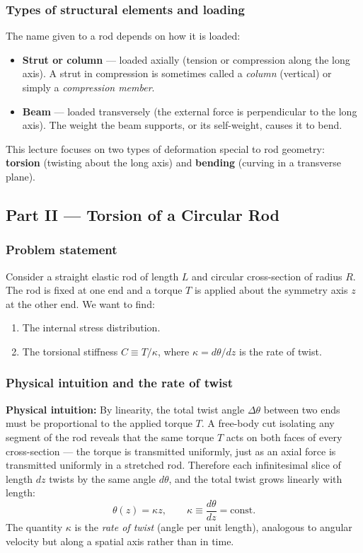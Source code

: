 \documentclass[../main.tex]{subfiles}
\begin{document}
\subsubsection*{Types of structural elements and loading}

The name given to a rod depends on how it is loaded:
\begin{itemize}
    \item \textbf{Strut or column} — loaded axially (tension or compression along the long axis). A strut in compression is sometimes called a \emph{column} (vertical) or simply a \emph{compression member}.
    \item \textbf{Beam} — loaded transversely (the external force is perpendicular to the long axis). The weight the beam supports, or its self-weight, causes it to bend.
\end{itemize}
This lecture focuses on two types of deformation special to rod geometry: \textbf{torsion} (twisting about the long axis) and \textbf{bending} (curving in a transverse plane).

\subsection*{Part II — Torsion of a Circular Rod}

\subsubsection*{Problem statement}

Consider a straight elastic rod of length $L$ and circular cross-section of radius $R$. The rod is fixed at one end and a torque $T$ is applied about the symmetry axis $z$ at the other end. We want to find:
\begin{enumerate}
    \item The internal stress distribution.
    \item The torsional stiffness $C \equiv T/\kappa$, where $\kappa = d\theta/dz$ is the rate of twist.
\end{enumerate}

\subsubsection*{Physical intuition and the rate of twist}

\noindent\textbf{Physical intuition:} By linearity, the total twist angle $\Delta\theta$ between two ends must be proportional to the applied torque $T$. A free-body cut isolating any segment of the rod reveals that the same torque $T$ acts on both faces of every cross-section — the torque is transmitted uniformly, just as an axial force is transmitted uniformly in a stretched rod. Therefore each infinitesimal slice of length $dz$ twists by the same angle $d\theta$, and the total twist grows linearly with length:
\[
    \theta(z) = \kappa z, \qquad \kappa \equiv \frac{d\theta}{dz} = \mathrm{const.}
\]
The quantity $\kappa$ is the \emph{rate of twist} (angle per unit length), analogous to angular velocity but along a spatial axis rather than in time.
\end{document}
